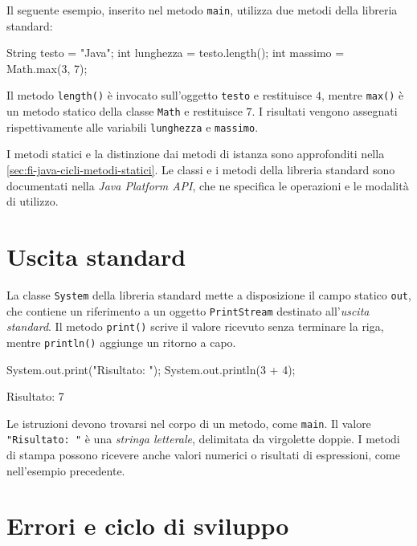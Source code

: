 \begin{example}
Il seguente esempio, inserito nel metodo \texttt{main},
utilizza due metodi della libreria standard:
\begin{unipdcode}[language=Java]
String testo = "Java";
int lunghezza = testo.length();
int massimo = Math.max(3, 7);
\end{unipdcode}
Il metodo \texttt{length()} è invocato sull'oggetto
\texttt{testo} e restituisce \(4\), mentre
\texttt{max()} è un metodo statico della classe
\texttt{Math} e restituisce \(7\). I risultati vengono
assegnati rispettivamente alle variabili \texttt{lunghezza}
e \texttt{massimo}.
\end{example}

I metodi statici e la distinzione dai metodi di istanza sono
approfonditi nella \cref{sec:fi-java-cicli-metodi-statici}. Le classi
e i metodi della libreria standard sono documentati nella
\emph{Java Platform API}, che ne specifica le operazioni e le
modalità di utilizzo.

\section{Uscita standard}
\label{sec:fi-java-uscita-standard}

La classe \texttt{System} della libreria standard mette a
disposizione il campo statico \texttt{out}, che contiene un
riferimento a un oggetto \texttt{PrintStream} destinato
all'\emph{uscita standard}. Il metodo \texttt{print()}
scrive il valore ricevuto senza terminare la riga, mentre
\texttt{println()} aggiunge un ritorno a capo.

\begin{unipdcode}[language=Java]
System.out.print("Risultato: ");
System.out.println(3 + 4);
\end{unipdcode}

\begin{unipdterminal}
Risultato: 7
\end{unipdterminal}

Le istruzioni devono trovarsi nel corpo di un metodo, come
\texttt{main}. Il valore \texttt{"Risultato: "} è una
\emph{stringa letterale}, delimitata da virgolette doppie.
I metodi di stampa possono ricevere anche valori numerici
o risultati di espressioni, come nell'esempio precedente.

\clearpage

\section{Errori e ciclo di sviluppo}
\label{sec:fi-java-errori}

